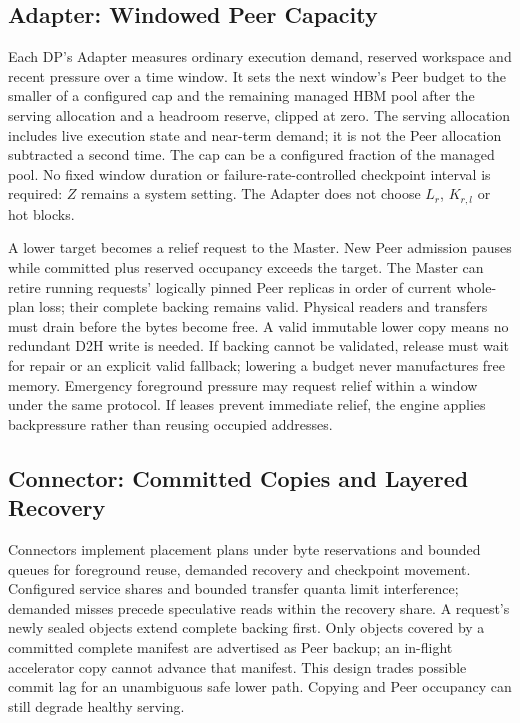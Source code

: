 \subsection{Adapter: Windowed Peer Capacity}
\label{sec:adapter}

Each DP's Adapter measures ordinary execution demand, reserved workspace
and recent pressure over a time window. It sets the next window's Peer
budget to the smaller of a configured cap and the remaining managed HBM
pool after the serving allocation and a headroom reserve, clipped at zero.
The serving allocation includes live execution state and near-term demand;
it is not the Peer allocation subtracted a second time. The cap can be a
configured fraction of the managed pool. No fixed window duration or
failure-rate-controlled checkpoint interval is required: $Z$ remains a
system setting. The Adapter does not choose $L_r$, $K_{r,l}$ or hot blocks.

A lower target becomes a relief request to the Master. New Peer admission
pauses while committed plus reserved occupancy exceeds the target. The
Master can retire running requests' logically pinned Peer replicas in
order of current whole-plan loss; their complete backing remains valid.
Physical readers and transfers must drain before the bytes become free.
A valid immutable lower copy means no redundant D2H write is needed.
If backing cannot be validated, release must wait for repair or an explicit
valid fallback; lowering a budget never manufactures free memory.
Emergency foreground pressure may request relief within a window under
the same protocol. If leases prevent immediate relief, the engine applies
backpressure rather than reusing occupied addresses.

\subsection{Connector: Committed Copies and Layered Recovery}
\label{sec:connector}

Connectors implement placement plans under byte reservations and bounded
queues for foreground reuse, demanded recovery and checkpoint movement.
Configured service shares and bounded transfer quanta limit interference;
demanded misses precede speculative reads within the recovery share.
A request's newly sealed objects extend complete backing first. Only
objects covered by a committed complete manifest are advertised as Peer
backup; an in-flight accelerator copy cannot advance that manifest.
This design trades possible commit lag for an unambiguous safe lower path.
Copying and Peer occupancy can still degrade healthy serving.

